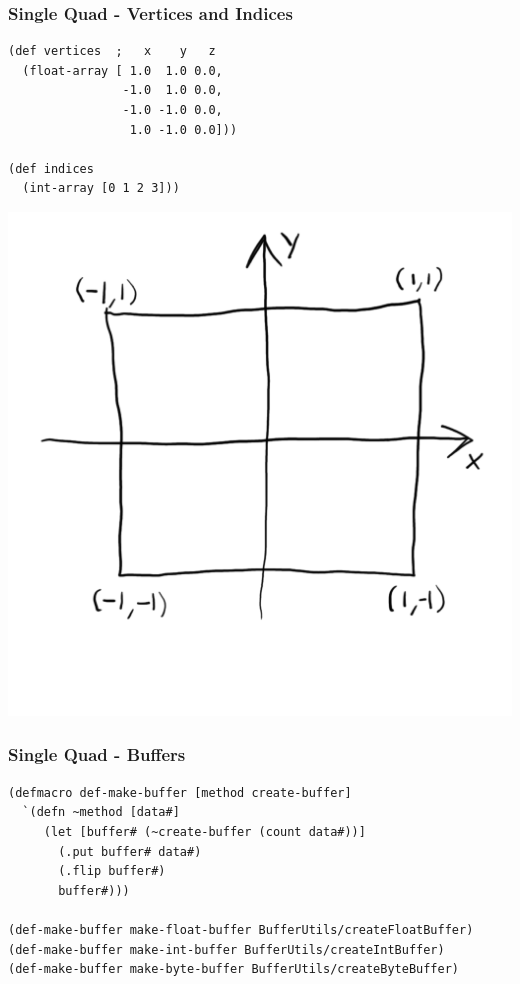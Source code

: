 \documentclass[aspectratio=169,11pt,xcolor=dvipsnames]{beamer}
\begin{document}
\begin{frame}[fragile]
  \frametitle{Single Quad {-} Vertices and Indices}
  \begin{minipage}[c]{.48\textwidth}
    \begin{verbatim}
(def vertices  ;   x    y   z
  (float-array [ 1.0  1.0 0.0,
                -1.0  1.0 0.0,
                -1.0 -1.0 0.0,
                 1.0 -1.0 0.0]))

(def indices
  (int-array [0 1 2 3]))
    \end{verbatim}
  \end{minipage}
  \begin{minipage}[c]{.48\textwidth}
    \includegraphics[width=\textwidth]{quadcoords}
  \end{minipage}
\end{frame}

\begin{frame}[fragile]
  \frametitle{Single Quad {-} Buffers}
  \begin{verbatim}
(defmacro def-make-buffer [method create-buffer]
  `(defn ~method [data#]
     (let [buffer# (~create-buffer (count data#))]
       (.put buffer# data#)
       (.flip buffer#)
       buffer#)))

(def-make-buffer make-float-buffer BufferUtils/createFloatBuffer)
(def-make-buffer make-int-buffer BufferUtils/createIntBuffer)
(def-make-buffer make-byte-buffer BufferUtils/createByteBuffer)
  \end{verbatim}
\end{frame}
\end{document}
